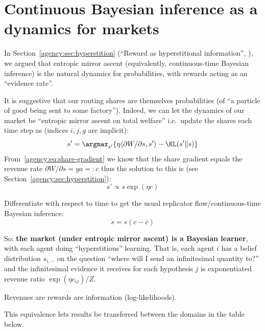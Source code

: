 \section{Continuous Bayesian inference as a dynamics for markets}\label{agency:sec:cbi}

In Section~\ref{agency:sec:hyperstition}
(``Reward as hyperstitional information'', \citealt{pallavisudhirRewardHyperstitional2026}), we argued that entropic mirror ascent (equivalently,
continuous-time Bayesian inference) is the natural dynamics for probabilities, with rewards
acting as an ``evidence rate''.

It is suggestive that our routing shares are themselves probabilities (of ``a
particle of good being sent to some factory''). Indeed, we can let the dynamics of our
market be ``entropic mirror ascent on total welfare'' i.e.\ update the shares each time step
as (indices $i,j,g$ are implicit):
\[s'=\argmax_{s'} \{\eta\langle \partial W/\partial s, s'\rangle - \KL(s'\|s)\}\]
From~\eqref{agency:eq:share-gradient} we know that the share gradient equals the revenue
rate $\partial W/\partial s = ya =: c$ thus the solution to this is (see
Section~\ref{agency:sec:hyperstition}):
\begin{equation}
s' \propto s \exp{(\eta c)}\label{agency:eq:mwu}
\end{equation}

Differentiate with respect to time to get the usual replicator flow/continuous-time Bayesian
inference:
\begin{equation}
\dot s = s\left( c - \bar c \right)\label{agency:eq:replicator}
\end{equation}

So: \textbf{the market (under entropic mirror ascent) is a Bayesian learner}, with each
agent doing ``hyperstitious'' learning. That is, each agent $i$ has a belief distribution
$s_{i,-}$ on the question ``where will I send an infinitesimal quantity to?'' and the
infinitesimal evidence it receives for each hypothesis $j$ is exponentiated revenue ratio
$\exp{(\eta c_{ij})}/Z$.

\begin{thesisclaim}
Revenues are rewards are information (log-likelihoods).
\end{thesisclaim}

This equivalence lets results be transferred between the domains in the table below.

